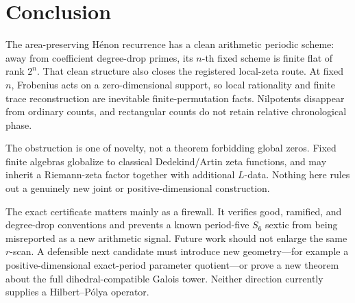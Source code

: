 \section{Conclusion}

The area-preserving H\'enon recurrence has a clean arithmetic periodic scheme:
away from coefficient degree-drop primes, its $n$-th fixed scheme is finite
flat of rank $2^n$.  That clean structure also closes the registered local-zeta
route.  At fixed $n$, Frobenius acts on a zero-dimensional support, so local
rationality and finite trace reconstruction are inevitable finite-permutation
facts.  Nilpotents disappear from ordinary counts, and rectangular counts do
not retain relative chronological phase.

The obstruction is one of novelty, not a theorem forbidding global zeros.
Fixed finite algebras globalize to classical Dedekind/Artin zeta functions,
and may inherit a Riemann-zeta factor together with additional $L$-data.
Nothing here rules out a genuinely new joint or positive-dimensional
construction.

The exact certificate matters mainly as a firewall.  It verifies good,
ramified, and degree-drop conventions and prevents a known period-five $S_6$
sextic from being misreported as a new arithmetic signal.  Future work should
not enlarge the same $r$-scan.  A defensible next candidate must introduce new
geometry---for example a positive-dimensional exact-period parameter
quotient---or prove a new theorem about the full dihedral-compatible Galois
tower.  Neither direction currently supplies a Hilbert--P\'olya operator.

